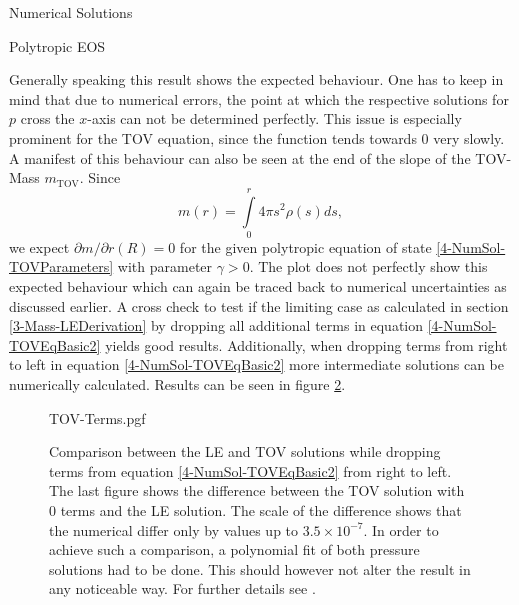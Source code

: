\begin{section}{Numerical Solutions}
\begin{subsection}{Polytropic EOS}
\begin{figure}[H]
	\label{4-NumSol-TOVEqEasyEOS}
\end{figure}\noindent
Generally speaking this result shows the expected behaviour. One has to keep in mind that due to numerical errors, the point at which the respective solutions for $p$ cross the $x$-axis can not be determined perfectly. This issue is especially prominent for the TOV equation, since the function tends towards $0$ very slowly.\\
A manifest of this behaviour can also be seen at the end of the slope of the TOV-Mass $m_{\text{TOV}}$. Since
\begin{equation}
	m(r) = \int\limits_0^r 4\pi s^2\rho(s)ds,
\end{equation}
we expect $\partial m/\partial r(R)=0$ for the given polytropic equation of state \ref{4-NumSol-TOVParameters} with parameter $\gamma>0$. The plot does not perfectly show this expected behaviour which can again be traced back to numerical uncertainties as discussed earlier.
A cross check to test if the limiting case as calculated in section \ref{3-Mass-LEDerivation} by dropping all additional terms in equation \ref{4-NumSol-TOVEqBasic2} yields good results. Additionally, when dropping terms from right to left in equation \ref{4-NumSol-TOVEqBasic2} more intermediate solutions can be numerically calculated. Results can be seen in figure \ref{4-NumSol-TovTerms}.
\begin{figure}[ht]
	\centering
	{TOV-Terms.pgf}
	\caption[Comparison LE and partial TOV]{Comparison between the LE and TOV solutions while dropping terms from equation \ref{4-NumSol-TOVEqBasic2} from right to left. The last figure shows the difference between the TOV solution with 0 terms and the LE solution. The scale of the difference shows that the numerical differ only by values up to $3.5\times10^{-7}$. In order to achieve such a comparison, a polynomial fit of both pressure solutions had to be done. This should however not alter the result in any noticeable way. For further details see \cite{pleyerGithubRepositoryJonas}.}
	\label{4-NumSol-TovTerms}
\end{figure}


\end{subsection}
\end{section}
